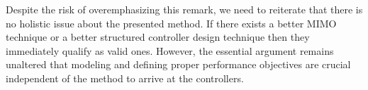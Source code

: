Despite the risk of overemphasizing this remark, we need to reiterate that there is no holistic issue about the presented method. If there 
exists a better MIMO technique or a better structured controller design technique then they immediately qualify as valid ones. However, the 
essential argument remains unaltered that modeling and defining proper performance objectives are crucial independent of the method to 
arrive at the controllers.


%
%
%
%
